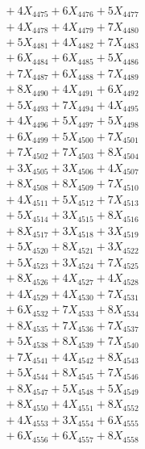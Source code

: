 \documentclass[a4paper,10pt]{article}
\begin{document}
{\begin{align}
&\;  + 4 X_{4475} + 6 X_{4476} + 5 X_{4477} \\[0.3ex]
&\;  + 4 X_{4478} + 4 X_{4479} + 7 X_{4480} \\[0.5ex]\allowbreak
&\;  + 5 X_{4481} + 4 X_{4482} + 7 X_{4483} \\[0.3ex]
&\;  + 6 X_{4484} + 6 X_{4485} + 5 X_{4486} \\[0.3ex]
&\;  + 7 X_{4487} + 6 X_{4488} + 7 X_{4489} \\[0.3ex]
&\;  + 8 X_{4490} + 4 X_{4491} + 6 X_{4492} \\[0.3ex]
&\;  + 5 X_{4493} + 7 X_{4494} + 4 X_{4495} \\[0.3ex]
&\;  + 4 X_{4496} + 5 X_{4497} + 5 X_{4498} \\[0.3ex]
&\;  + 6 X_{4499} + 5 X_{4500} + 7 X_{4501} \\[0.3ex]
&\;  + 7 X_{4502} + 7 X_{4503} + 8 X_{4504} \\[0.3ex]
&\;  + 3 X_{4505} + 3 X_{4506} + 4 X_{4507} \\[0.3ex]
&\;  + 8 X_{4508} + 8 X_{4509} + 7 X_{4510} \\[0.5ex]\allowbreak
&\;  + 4 X_{4511} + 5 X_{4512} + 7 X_{4513} \\[0.3ex]
&\;  + 5 X_{4514} + 3 X_{4515} + 8 X_{4516} \\[0.3ex]
&\;  + 8 X_{4517} + 3 X_{4518} + 3 X_{4519} \\[0.3ex]
&\;  + 5 X_{4520} + 8 X_{4521} + 3 X_{4522} \\[0.3ex]
&\;  + 5 X_{4523} + 3 X_{4524} + 7 X_{4525} \\[0.3ex]
&\;  + 8 X_{4526} + 4 X_{4527} + 4 X_{4528} \\[0.3ex]
&\;  + 4 X_{4529} + 4 X_{4530} + 7 X_{4531} \\[0.3ex]
&\;  + 6 X_{4532} + 7 X_{4533} + 8 X_{4534} \\[0.3ex]
&\;  + 8 X_{4535} + 7 X_{4536} + 7 X_{4537} \\[0.3ex]
&\;  + 5 X_{4538} + 8 X_{4539} + 7 X_{4540} \\[0.5ex]\allowbreak
&\;  + 7 X_{4541} + 4 X_{4542} + 8 X_{4543} \\[0.3ex]
&\;  + 5 X_{4544} + 8 X_{4545} + 7 X_{4546} \\[0.3ex]
&\;  + 8 X_{4547} + 5 X_{4548} + 5 X_{4549} \\[0.3ex]
&\;  + 8 X_{4550} + 4 X_{4551} + 8 X_{4552} \\[0.3ex]
&\;  + 4 X_{4553} + 3 X_{4554} + 6 X_{4555} \\[0.3ex]
&\;  + 6 X_{4556} + 6 X_{4557} + 8 X_{4558} \\[0.3ex]

\end{align}}
\end{document}
